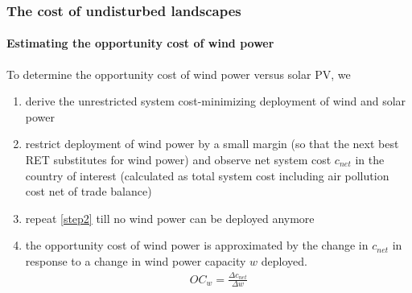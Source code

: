 \documentclass[aspectratio=1610, xcolor=dvipsnames,handout]{beamer} %
\begin{document}
    \begin{frame}
        \frametitle{The cost of undisturbed landscapes}
        \framesubtitle{Estimating the opportunity cost of wind power}
        To determine the opportunity cost of wind power versus solar PV, we
        \begin{enumerate}
            \item derive the unrestricted system cost-minimizing deployment of wind and solar power \label{step1}
            \item restrict deployment of wind power by a small margin (so that the next best RET substitutes for wind power) and
            observe net system cost $c_{net}$ in the country of interest (calculated as total system cost including air
            pollution cost net of trade balance) \label{step2}
            \item repeat \ref{step2} till no wind power can be deployed anymore
            \item the opportunity cost of wind power is approximated by the change in $c_{net}$ in response to a change in wind
            power capacity $w$ deployed.
            \begin{align*}
                OC_w = \frac{\Delta c_{net}}{\Delta w}
            \end{align*}
        \end{enumerate}
    \end{frame}
\end{document}
